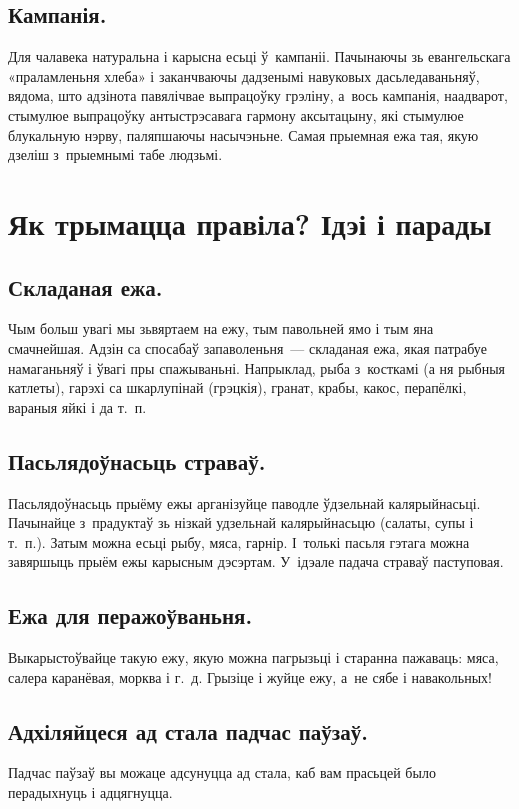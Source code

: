 \subsection{Кампанія.}
Для чалавека натуральна і карысна есьці ў~кампаніі. Пачынаючы зь евангельскага «праламленьня хлеба» і заканчваючы дадзенымі навуковых дасьледаваньняў, вядома, што адзінота павялічвае выпрацоўку грэліну, а~вось кампанія, наадварот, стымулюе выпрацоўку антыстрэсавага гармону аксытацыну, які стымулюе блукальную нэрву, паляпшаючы насычэньне. Самая прыемная ежа тая, якую дзеліш з~прыемнымі табе людзьмі.

\section{Як трымацца правіла? Ідэі і парады}

\subsection{Складаная ежа.}
Чым больш увагі мы зьвяртаем на ежу, тым павольней ямо і тым яна смачнейшая. Адзін са спосабаў запаволеньня~--- складаная ежа, якая патрабуе намаганьняў і ўвагі пры спажываньні. Напрыклад, рыба з~косткамі (а ня рыбныя катлеты), гарэхі са шкарлупінай (грэцкія), гранат, крабы, какос, перапёлкі, вараныя яйкі і да т.~п.

\subsection{Пасьлядоўнасьць страваў.}
Пасьлядоўнасьць прыёму ежы арганізуйце паводле ўдзельнай калярыйнасьці. Пачынайце з~прадуктаў зь нізкай удзельнай калярыйнасьцю (салаты, супы і т.~п.). Затым можна есьці рыбу, мяса, гарнір. І~толькі пасьля гэтага можна завяршыць прыём ежы карысным дэсэртам. У~ідэале падача страваў паступовая.

\subsection{Ежа для перажоўваньня.}
Выкарыстоўвайце такую ежу, якую можна пагрызьці і старанна пажаваць: мяса, салера каранёвая, морква і г.~д. Грызіце і жуйце ежу, а~не сябе і навакольных!


\subsection{Адхіляйцеся ад стала падчас паўзаў.}
Падчас паўзаў вы можаце адсунуцца ад стала, каб вам прасьцей было перадыхнуць і адцягнуцца.

